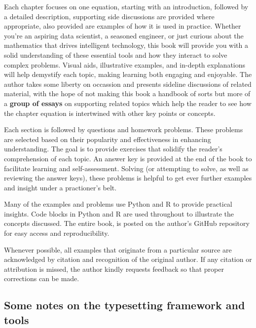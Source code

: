 \documentclass[
  12 pt,
  a4paper,
]{book}
\numberwithin{equation}{section}
\theoremstyle{plain}      %
\theoremstyle{definition} %
\theoremstyle{remark}     %
\theoremstyle{note}         %
\begin{document}
Each chapter focuses on one equation, starting with an introduction,
followed by a detailed description, supporting side discussions are
provided where appropriate, also provided are examples of how it is used
in practice. Whether you're an aspiring data scientist, a seasoned
engineer, or just curious about the mathematics that drives intelligent
technology, this book will provide you with a solid understanding of
these essential tools and how they interact to solve complex problems.
Visual aids, illustrative examples, and in-depth explanations will help
demystify each topic, making learning both engaging and enjoyable. The
author takes some liberty on occassion and presents sideline discussions
of related material, with the hope of not making this book a handbook of
sorts but more of a \textbf{group of essays} on supporting related
topics which help the reader to see how the chapter equation is
intertwined with other key points or concepts.

Each section is followed by questions and homework problems. These
problems are selected based on their popularity and effectiveness in
enhancing understanding. The goal is to provide exercises that solidify
the reader's comprehension of each topic. An answer key is provided at
the end of the book to facilitate learning and self-assessment. Solving
(or attempting to solve, as well as reviewing the answer keys), these
problems is helpful to get ever further examples and insight under a
practioner's belt.

Many of the examples and problems use Python and R to provide practical
insights. Code blocks in Python and R are used throughout to illustrate
the concepts discussed. The entire book, is posted on the author's
GitHub repository for easy access and reproducibility.

Whenever possible, all examples that originate from a particular source
are acknowledged by citation and recognition of the original author. If
any citation or attribution is missed, the author kindly requests
feedback so that proper corrections can be made.

\hypertarget{some-notes-on-the-typesetting-framework-and-tools}{%
\subsection*{Some notes on the typesetting framework and
tools}\label{some-notes-on-the-typesetting-framework-and-tools}}
\end{document}
